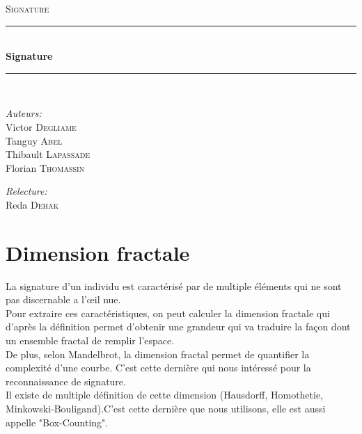 \documentclass[pdftex,12pt,a4paper]{report}
\newcommand{\HRule}{\rule{\linewidth}{0.5mm}}
\begin{document}
\begin{titlepage}
\begin{center}
\textsc{\LARGE Signature}\\[1.5cm]

\HRule \\[0.4cm]
{\huge \bfseries Signature}\\[0.4cm]
\HRule \\[1.5cm]
\end{center}

\begin{minipage}{0.4\textwidth}
	\begin{flushleft} \large
		\emph{Auteurs:}\\
			Victor \textsc{Degliame} \\
			Tanguy \textsc{Abel} \\
			Thibault \textsc{Lapassade} \\
			Florian \textsc{Thomassin} \\
	\end{flushleft}
\end{minipage}
\begin{minipage}{0.4\textwidth}
	\begin{flushright} \large
		\emph{Relecture:} \\
              Reda \textsc{Dehak}
	\end{flushright}
\end{minipage}
\end{titlepage}

\tableofcontents

\section{Dimension fractale}
La signature d'un individu est caractérisé par de multiple éléments qui ne sont pas discernable a l'œil nue.\\

Pour extraire ces caractéristiques, on peut calculer la dimension fractale qui d'après la définition permet d'obtenir une grandeur qui va traduire la façon dont un ensemble fractal de remplir l'espace.\\

De plus, selon Mandelbrot, la dimension fractal permet de quantifier la complexité d'une courbe.
C'est cette dernière qui nous intéressé pour la reconnaissance de signature.\\

Il existe de multiple définition de cette dimension (Hausdorff, Homothetie, Minkowski-Bouligand).C'est cette dernière que nous utilisons, elle est aussi appelle "Box-Counting".\\
\end{document}
